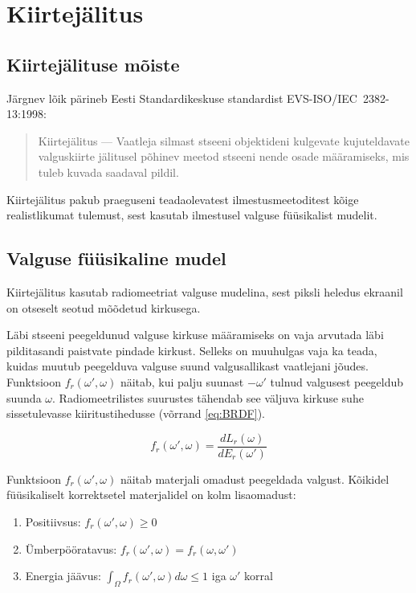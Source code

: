 \documentclass[a4paper,12pt]{report}
\begin{document}
\chapter{Kiirtejälitus}
\section{Kiirtejälituse mõiste}
Järgnev lõik pärineb Eesti Standardikeskuse standardist EVS-ISO/IEC~2382-13:1998:
\begin{quote}
Kiirtejälitus --- Vaatleja silmast stseeni objektideni kulgevate
kujuteldavate valguskiirte jälitusel põhinev meetod stseeni nende osade
määramiseks, mis tuleb kuvada saadaval pildil.\cite{ISO:2382-13}
\end{quote}

Kiirtejälitus pakub praeguseni teadaolevatest ilmestusmeetoditest kõige
realistlikumat tulemust, sest kasutab ilmestusel valguse füüsikalist
mudelit.


\section{Valguse füüsikaline mudel}
Kiirtejälitus kasutab radiomeetriat valguse mudelina, sest piksli heledus
ekraanil on otseselt seotud mõõdetud kirkusega.

Läbi stseeni peegeldunud valguse kirkuse määramiseks on vaja arvutada
läbi pildi\-tasandi paistvate pindade kirkust. Selleks on muuhulgas vaja
ka teada, kuidas muutub peegelduva valguse suund valgusallikast vaatlejani
jõudes. Funktsioon \(f_r(\omega', \omega)\) näitab, kui palju suunast
\(-\omega'\) tulnud valgusest peegeldub suunda \(\omega\). Radiomeetrilistes
suurustes tähendab see väljuva kirkuse suhe sissetulevasse kiiritustihedusse
(võrrand \ref{eq:BRDF}).

\begin{equation} \label{eq:BRDF}
f_r(\omega', \omega) = \frac{dL_r(\omega)}{dE_r(\omega')}
\end{equation}

Funktsioon \(f_r(\omega', \omega)\) näitab materjali omadust peegeldada
valgust. Kõikidel füü\-si\-ka\-li\-selt korrektsetel materjalidel on kolm
lisaomadust:

\begin{enumerate}
\item Positiivsus: \(f_r(\omega', \omega) \geq 0 \)
\item Ümberpööratavus: \(f_r(\omega', \omega) = f_r(\omega, \omega')\)
\item Energia jäävus: \(\int_\Omega f_r(\omega', \omega) d\omega \leq 1\) iga \(\omega'\) korral
\end{enumerate}
\end{document}
